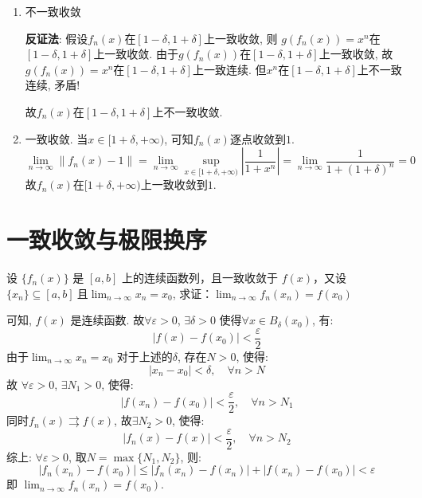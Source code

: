 \begin{solution}
\begin{enumerate}
        \item 不一致收敛

            \textbf{反证法}:
            假设\(f_{n}(x)\)在\([1-\delta,1+\delta]\)上一致收敛, 则
            \(g(f_n(x))=x^{n}\)在\([1-\delta,1+\delta]\)上一致收敛.
            由于\(g(f_n(x))\)在\([1-\delta,1+\delta]\)上一致收敛,
            故\(g(f_n(x)) = x^{n}\)在\([1-\delta,1+\delta]\)上一致连续.
            但\(x^{n}\)在\([1-\delta,1+\delta]\)上不一致连续, 矛盾!

            故\(f_{n}(x)\)在\([1-\delta,1+\delta]\)上不一致收敛.

        \item 一致收敛.
            当\(x \in [1+\delta,+\infty)\),
            可知\(f_n(x)\)逐点收敛到\(1\). %
            \[
                \lim_{n \to \infty} \left\lVert f_{n}(x) -
                1 \right\rVert
                = \lim_{n \to \infty} \sup_{x \in
                [1+\delta,+\infty)} \left\vert %
                \frac{1}{1 + x^{n}} \right\vert
                = \lim_{n \to \infty} \frac{1}{1+(1+\delta)^{n}} = 0
            \]
            故\(f_{n}(x)\)在\([1+\delta,+\infty)\)上一致收敛到\(1\). %
    \end{enumerate}
\end{solution}

\section{一致收敛与极限换序}
\begin{problem}
    设 \(\{f_n(x)\}\) 是 \([a, b]\) 上的连续函数列，且一致收敛于 \(f(x)\)，又设\(\{x_n\}
    \subseteq [a, b] \ \)且\( \lim_{n \to \infty} x_n = x_0\),
    求证：\(\lim_{n \to \infty} f_n(x_n) = f(x_0)\)
\end{problem}

\begin{solution}
    可知, \(f(x)\) 是连续函数. 故\(\forall \varepsilon > 0\),
    \(\exists \delta > 0\)
    使得\(\forall x \in B_{\delta}(x_{0})\), 有:
    \[
        \left| f(x)- f(x_{0}) \right| < \frac{\varepsilon}{2}
    \]
    由于\(\lim_{n \to \infty} x_{n}=x_{0}\) 对于上述的\(\delta\),
    存在\(N>0\), 使得:
    \[
        \left| x_{n} - x_{0} \right| < \delta, \quad \forall n > N
    \]
    故 \(\forall \varepsilon > 0\), \(\exists N_1 > 0\), 使得:
    \[
        \left| f(x_{n})- f(x_{0}) \right| <
        \frac{\varepsilon}{2}, \quad
        \forall n > N_1
    \]
    同时\(f_{n}(x) \rightrightarrows f(x)\), 故\(\exists N_2 > 0\), 使得:
    \[
        \left| f_{n}(x) - f(x) \right| < \frac{\varepsilon}{2}, \quad
        \forall n > N_2
    \]
    综上: \(\forall \varepsilon > 0\), 取\(N = \max\{N_1, N_2\}\), 则:
    \[
        \left| f_{n}(x_{n}) - f(x_{0}) \right| \le \left|
        f_{n}(x_{n}) -
        f(x_{n}) \right| + \left| f(x_{n}) - f(x_{0})
        \right| < \varepsilon
    \]
    即 \(\lim_{n \to \infty} f_{n}(x_{n}) = f(x_{0})\).
\end{solution}

